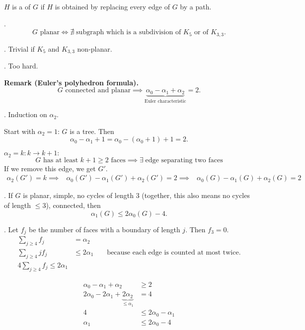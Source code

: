 \begin{definition}
$H$ is a  of $G$ if $H$ is obtained by replacing every edge of $G$ by a path.
\end{definition}


\Theorem.
\[
    G\text{ planar} \iff \nexists\;\text{subgraph which is a subdivision of $K_5$ or of $K_{3,3}$.}
\]

\ProofBackward. Trivial if $K_5$ and $K_{3,3}$ non-planar.

\ProofForward. Too hard.

\textbf{Remark (Euler's polyhedron formula).}
\[
    G\text{ connected and planar} \implies
    \underbrace{\alpha_0 - \alpha_1 + \alpha_2}_
        {\text{Euler characteristic}}
    = 2.
\]



\Proof.
Induction on $\alpha_2$.

Start with $\alpha_2=1$: $G$ is a tree. Then
\[
    \alpha_0-\alpha_1+1 = \alpha_0 - (\alpha_0 + 1) + 1 = 2.
\]

$\alpha_2 = k : k\rightarrow k+1: $
\[
    \text{$G$ has at least $k+1 \geq 2$ faces} \implies
    \exists\;\text{edge separating two faces}
\]
If we remove this edge, we get $G'$.
\begin{align*}
    \alpha_2(G') = k
    \implies &\alpha_0(G') - \alpha_1(G') + \alpha_2(G') = 2
    \implies &\alpha_0(G) - \alpha_1(G) + \alpha_2(G) = 2
\end{align*}

\Lemma.
If $G$ is planar, simple, no cycles of length $3$ (together, this also means no cycles of length $≤ 3$), connected, then
\[
    \alpha_1(G) ≤ 2\alpha_0(G) - 4.
\]

\Proof. 
Let $f_j$ be the number of faces with a boundary of length $j$.
Then $f_3 = 0$.
\begin{align*}
\sum_{j≥4} f_j &= \alpha_2 \\
\sum_{j≥4} j f_j &≤ 2\alpha_1
    &&\text{ because each edge is counted at most twice.} \\
4 \sum_{j≥4} f_j ≤ 2\alpha_1
\end{align*}


\begin{align*}
    \alpha_0 - \alpha_1 + \alpha_2 &≥ 2 \\
    2\alpha_0 - 2\alpha_1 +
    \underbrace{2\alpha_2}_{≤ \alpha_1} &= 4 \\
    4 &≤ 2\alpha_0 - \alpha_1 \\
    \alpha_1 &≤ 2\alpha_0 - 4
\end{align*}

